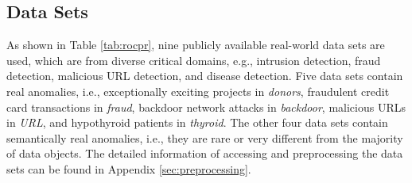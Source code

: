 \documentclass[sigconf]{acmart}
\begin{document}
\subsection{Data Sets}

As shown in Table \ref{tab:rocpr}, nine publicly available real-world data sets are used, which are from diverse critical domains, e.g., intrusion detection, fraud detection, malicious URL detection, and disease detection. Five data sets contain real anomalies, i.e., exceptionally exciting projects in \textit{donors}, fraudulent credit card transactions in \textit{fraud}, backdoor network attacks in \textit{backdoor}, malicious URLs in \textit{URL}, and hypothyroid patients in \textit{thyroid}. The other four data sets contain semantically real anomalies, i.e., they are rare or very different from the majority of data objects. The detailed information of accessing and preprocessing the data sets can be found in Appendix \ref{sec:preprocessing}.
\end{document}
